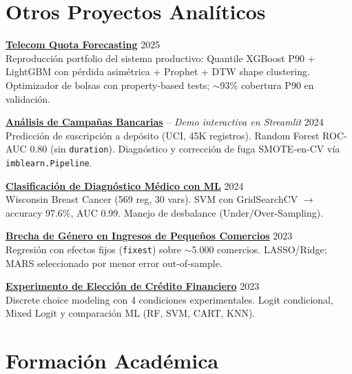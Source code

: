 \documentclass[a4paper,10pt]{article}
\newcommand{\entryspace}{\vspace{5pt}}
\begin{document}
\section*{Otros Proyectos Analíticos}

\textbf{\href{https://github.com/jsanchez-ds/telecom-quota-forecasting}{Telecom Quota Forecasting}} \hfill 2025 \\
Reproducción portfolio del sistema productivo: Quantile XGBoost P90 + LightGBM con pérdida asimétrica + Prophet + DTW shape clustering. Optimizador de bolsas con property-based tests; $\sim$93\% cobertura P90 en validación.

\entryspace

\textbf{\href{https://bank-marketing-analysis-jsanchez.streamlit.app/}{Análisis de Campañas Bancarias}} -- \textit{Demo interactiva en Streamlit} \hfill 2024 \\
Predicción de suscripción a depósito (UCI, 45K registros). Random Forest ROC-AUC 0.80 (sin \texttt{duration}). Diagnóstico y corrección de fuga SMOTE-en-CV vía \texttt{imblearn.Pipeline}.

\entryspace

\textbf{\href{https://jsanchez-ds.github.io/medical-diagnosis-classification/}{Clasificación de Diagnóstico Médico con ML}} \hfill 2024 \\
Wisconsin Breast Cancer (569 reg, 30 vars). SVM con GridSearchCV $\to$ accuracy 97.6\%, AUC 0.99. Manejo de desbalance (Under/Over-Sampling).

\entryspace

\textbf{\href{https://jsanchez-ds.github.io/gender-income-gap/}{Brecha de Género en Ingresos de Pequeños Comercios}} \hfill 2023 \\
Regresión con efectos fijos (\texttt{fixest}) sobre $\sim$5.000 comercios. LASSO/Ridge; MARS seleccionado por menor error out-of-sample.

\entryspace

\textbf{\href{https://jsanchez-ds.github.io/credit-choice-experiment/}{Experimento de Elección de Crédito Financiero}} \hfill 2023 \\
Discrete choice modeling con 4 condiciones experimentales. Logit condicional, Mixed Logit y comparación ML (RF, SVM, CART, KNN).

\section*{Formación Académica}
\end{document}
